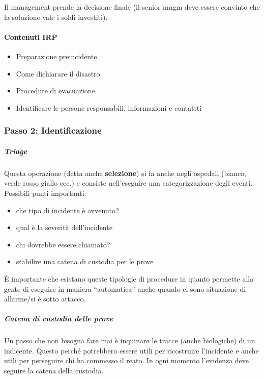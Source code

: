 Il management prende la decisione finale (il senior mngm deve essere convinto 
che la soluzione vale i soldi investiti).

\paragraph*{Contenuti IRP}

\begin{itemize}
\item Preparazione preincidente
\item Come dichiarare il disastro
\item Procedure di evacuazione
\item Identificare le persone responsabili, informazioni e contattti
\end{itemize}

\subsubsection{Passo 2: Identificazione}
\subparagraph*{Triage} Questa operazione (detta anche \textbf{selezione}) si fa 
anche negli ospedali (bianco, verde rosso giallo ecc.) e consiste nell'eseguire 
una categorizzazione degli eventi. Possibili punti importanti:
\begin{itemize}
\item che tipo di incidente è avvenuto?
\item qual è la severità dell'incidente
\item chi dovrebbe essere chiamato?
\item stabilire una catena di custodia per le prove
\end{itemize}
È importante che esistano queste tipologie di procedure in quanto permette alla 
gente di eseguire in maniera ``automatica'' anche quando ci sono situazione di 
allarme/si è sotto attacco.

\subparagraph*{Catena di custodia delle prove} Un passo che non bisogna fare mai 
è inquinare le tracce (anche biologiche) di un indicente. Questo perché 
potrebbero essere utili per ricostruire l'incidente e anche utili per perseguire 
chi ha commesso il reato.
In ogni momento l'evidenza deve seguire la catena della custodia. %



